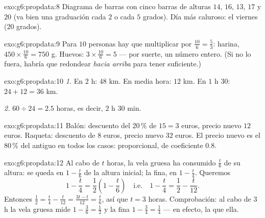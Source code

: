 \begin{solution}{exo:g6:propdata:8}
Diagrama de barras con cinco barras de alturas $14$, $16$, $13$, $17$ y $20$
(va bien una graduación cada $2$ o cada $5$ grados). Día más caluroso: el viernes
($20$ grados).
\end{solution}

\begin{solution}{exo:g6:propdata:9}
Para $10$ personas hay que multiplicar por $\frac{10}{6} = \frac53$: harina,
$450 \times \frac{10}{6} = 750$ g. Huevos:
$3 \times \frac{10}{6} = 5$ --- por suerte, un número entero. (Si no lo
fuera, habría que redondear \emph{hacia arriba} para tener suficiente.)
\end{solution}

\begin{solution}{exo:g6:propdata:10}
\emph{1.} En $2$ h: $48$ km. En media hora: $12$ km. En
$1$ h $30$: $24 + 12 = 36$ km.

\emph{2.} $60 \div 24 = 2.5$ horas, es decir, $2$ h $30$ min.
\end{solution}

\begin{solution}{exo:g6:propdata:11}
Balón: descuento del $20\,\%$ de $15 = 3$ euros, precio nuevo $12$ euros.
Raqueta: descuento de $8$ euros, precio nuevo $32$ euros. El precio nuevo es
el $80\,\%$ del antiguo en todos los casos: proporcional, de coeficiente
$0.8$.
\end{solution}

\begin{solution}{exo:g6:propdata:12}
Al cabo de $t$ horas, la vela gruesa ha consumido $\frac t6$ de su altura:
se queda en $1 - \frac t6$ de la altura inicial; la fina, en
$1 - \frac t4$. Queremos
\[
1 - \frac t4 = \frac12 \left(1 - \frac t6\right)
\quad\text{i.e.}\quad
1 - \frac t4 = \frac12 - \frac t{12}.
\]
Entonces $\frac12 = \frac t4 - \frac t{12} = \frac{3t - t}{12} =
\frac{t}{6}$, así que $t = 3$ horas. Comprobación: al cabo de $3$ h la vela gruesa
mide $1 - \frac36 = \frac12$ y la fina
$1 - \frac34 = \frac14$ --- en efecto, la  que ella.
\end{solution}

